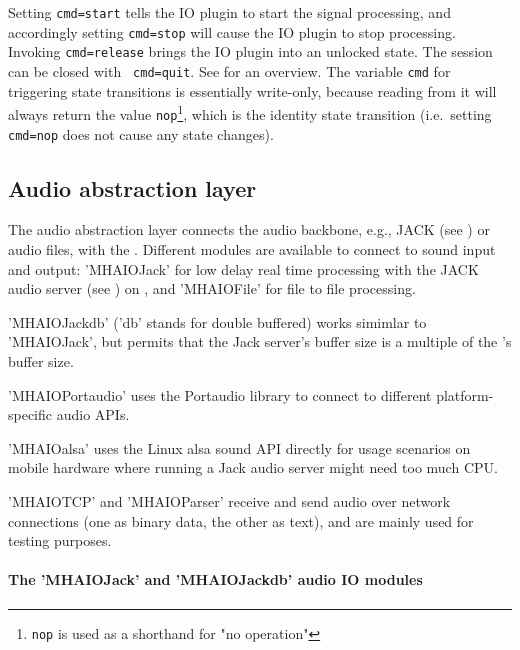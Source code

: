 Setting {\tt cmd=start} tells the IO plugin to start the signal
processing, and accordingly setting {\tt cmd=stop} will cause the IO
plugin to stop processing. Invoking {\tt cmd=release} brings the IO
plugin into an unlocked state. The session can be closed with {\tt
  cmd=quit}. See  for an overview.
%
The variable \verb!cmd! for triggering state transitions is
essentially write-only, because reading from it will always return the
value \verb!nop!\footnote{%
  \texttt{nop} is used as a shorthand for "no operation"%
}, which is the identity state transition (i.e.\ setting
\verb!cmd=nop! does not cause any state changes).


\subsection{Audio abstraction layer}%
\label{sec:audioabstraction}

The audio abstraction layer connects the audio backbone, e.g.,
JACK (see ) or audio files, with the \mhad{}.
%
Different modules are available to connect to sound input and output:
'MHAIOJack' for low delay real time processing with the JACK audio server
(see ) on \Linux{},
and 'MHAIOFile' for file to file processing.

'MHAIOJackdb' ('db' stands for double buffered) works simimlar to 'MHAIOJack',
but permits that the Jack server's buffer size is a multiple of the \mha's
buffer size.

'MHAIOPortaudio' uses the Portaudio library to connect to different
platform-specific audio APIs.

'MHAIOalsa' uses the Linux alsa sound API directly for usage scenarios on
mobile hardware where running a Jack audio server might need too much CPU.

'MHAIOTCP' and 'MHAIOParser' receive and send audio over network connections
(one as binary data, the other as text), and are mainly used for
testing purposes.

\paragraph{The 'MHAIOJack' and 'MHAIOJackdb' audio IO modules}%
%
%

